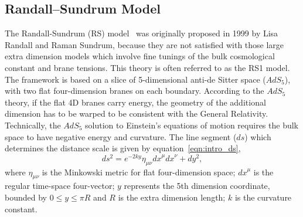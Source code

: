 \subsection{Randall–Sundrum Model}
The Randall-Sundrum (RS) model~\cite{Intro_RS1} was originally proposed in 1999 by Lisa Randall and Raman Sundrum, because they are not satisfied with those large extra dimension models which involve fine tunings of the bulk cosmological constant and brane tensions. This theory is often referred to as the RS1 model. The framework is based on a slice of 5-dimensional anti-de Sitter space ($AdS_{5}$), with two flat four-dimension branes on each boundary. According to the $AdS_{5}$ theory, if the flat 4D branes carry energy, the geometry of the additional dimension has to be warped to be consistent with the General Relativity. Technically, the $AdS_{5}$ solution to Einstein's equations of motion requires the bulk space to have negative energy and curvature. The line segment ($ds$) which determines the distance scale is given by equation~\ref{eqn:intro_ds},
\begin{equation}
ds^2 = e^{-2ky}{\eta}_{\mu\nu}{dx}^{\mu}{dx}^{\nu}+dy^2,
\label{eqn:intro_ds}
\end{equation}
where ${\eta}_{\mu\nu}$ is the Minkowski metric for flat four-dimension space; ${dx}^{\mu}$ is the regular time-space four-vector; $y$ represents the 5th dimension coordinate, bounded by $0\leq y \leq \pi R$ and $R$ is the extra dimension length; $k$ is the curvature constant.

